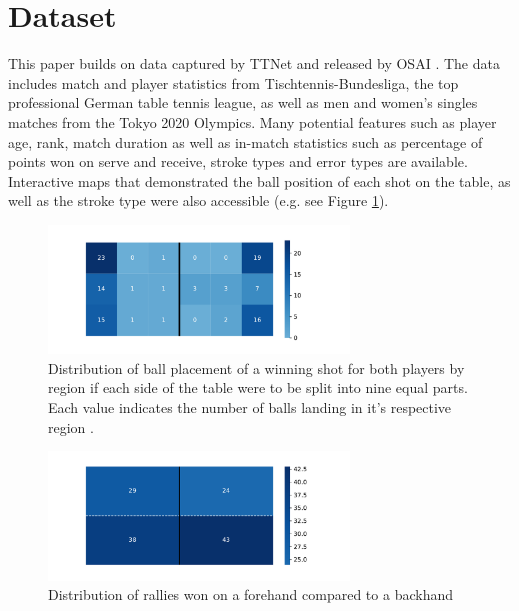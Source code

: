\section{Dataset} \label{dataset}
This paper builds on data captured by TTNet \cite{voeikov2020ttnet} and released by OSAI \cite{OSAI}. The data includes match and player statistics from Tischtennis-Bundesliga, the top professional German table tennis league, as well as men and women's singles matches from the Tokyo 2020 Olympics. Many potential features such as player age, rank, match duration as well as in-match statistics such as percentage of points won on serve and receive, stroke types and error types are available. Interactive maps that demonstrated the ball position of each shot on the table, as well as the stroke type were also accessible (e.g. see Figure \ref{fig1}).


\begin{figure}[ht]
\centering

\includegraphics[width=8cm]{plots/tableheatmaprot.pdf}
\caption{Distribution of ball placement of a winning shot for both players by region if each side of the table were to be split into nine equal parts. Each value indicates the number of balls landing in it's respective region \cite{OSAI}.}

\label{fig1}
\end{figure}

\begin{figure}[ht]
\centering

\includegraphics[width=8cm]{plots/forehandvsbackhand.pdf}
\caption{Distribution of rallies won on a forehand compared to a backhand}

\label{fvbh}
\end{figure}

